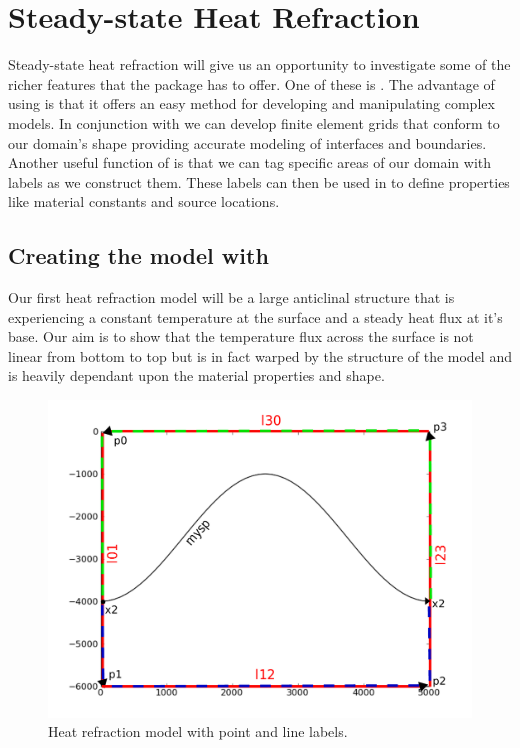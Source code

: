 
%
%
%

\section{Steady-state Heat Refraction}
\label{STEADY-STATE HEAT REFRACTION}
Steady-state heat refraction will give us an opportunity to investigate some of the richer features that the \esc package has to offer. One of these is \pycad . The advantage of using \pycad is that it offers an easy method for developing and manipulating complex models. In conjunction with \gmsh we can develop finite element grids that conform to our domain's shape providing accurate modeling of interfaces and boundaries. Another useful function of \pycad is that we can tag specific areas of our domain with labels as we construct them. These labels can then be used in \esc to define properties like material constants and source locations. 

\subsection{Creating the model with \pycad}

Our first heat refraction model will be a large anticlinal structure that is experiencing a constant temperature at the surface and a steady heat flux at it's base. Our aim is to show that the temperature flux across the surface is not linear from bottom to top but is in fact warped by the structure of the model and is heavily dependant upon the material properties and shape.

\begin{figure}[h!]
\centerline{\includegraphics[width=4.in]{figures/anticlineheatrefraction}}
\caption{Heat refraction model with point and line labels.}
\label{fig:anticlinehrmodel}
\end{figure}


